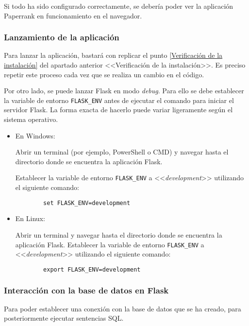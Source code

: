 \begin{enumerate}
   Si todo ha sido configurado correctamente, se debería poder ver la aplicación Paperrank en funcionamiento en el navegador.

\end{enumerate}


\subsubsection{Lanzamiento de la aplicación}

Para lanzar la aplicación, bastará con replicar el punto \ref{Verificación de la instalación} del apartado anterior <<Verificación de la instalación>>. Es preciso repetir este proceso cada vez que se realiza un cambio en el código.

Por otro lado, se puede lanzar Flask en modo \textit{debug}. Para ello se debe establecer la variable de entorno \texttt{FLASK\_ENV} antes de ejecutar el comando para iniciar el servidor Flask. La forma exacta de hacerlo puede variar ligeramente según el sistema operativo.
\begin{itemize}
    \item En Windows:
    
        Abrir un terminal (por ejemplo, PowerShell o CMD) y navegar hasta el directorio donde se encuentra la aplicación Flask.
    
        Establecer la variable de entorno \texttt{FLASK\_ENV} a <<\textit{development}>> utilizando el siguiente comando:
    
        \begin{verbatim}
        set FLASK_ENV=development
        \end{verbatim}
        
    \item En Linux:
    
        Abrir un terminal y navegar hasta el directorio donde se encuentra la aplicación Flask.
        Establecer la variable de entorno \texttt{FLASK\_ENV} a <<\textit{development}>> utilizando el siguiente comando:
    
        \begin{verbatim}
        export FLASK_ENV=development
        \end{verbatim}
\end{itemize}



\subsubsection{Interacción con la base de datos en Flask}
Para poder establecer una conexión con la base de datos que se ha creado, para posteriormente ejecutar sentencias SQL.

